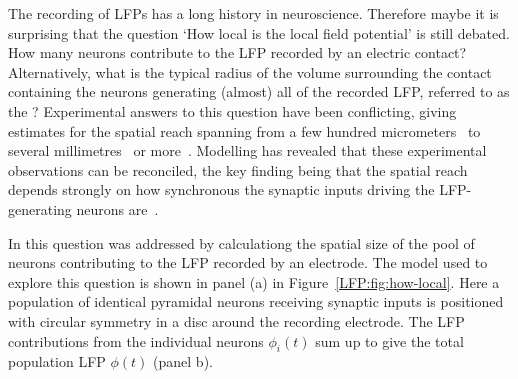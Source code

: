 The recording of LFPs has a long history in neuroscience. Therefore maybe it is surprising that the question 
`How local is the local field potential' is still debated. How many neurons contribute to the LFP 
recorded by an electric contact? Alternatively, what is the typical radius of the volume surrounding the contact containing
the neurons generating (almost) all of the recorded LFP,  referred to as the ? 
Experimental answers to this question have been conflicting, giving estimates for the spatial reach spanning from
a few hundred micrometers~\cite{Katzner2009,Xing2009} to several millimetres~\cite{Kreiman2006} or more~\cite{Kajikawa2011}.
Modelling has revealed that these experimental observations can be reconciled, the key finding being that the spatial reach depends strongly
on how synchronous the synaptic inputs driving the LFP-generating neurons are~\cite{Linden2011}.


In  this question was addressed by calculationg the spatial size of the pool of neurons 
contributing to the LFP recorded by an electrode. The model used to explore this question
is shown in panel (a) in Figure~\ref{LFP:fig:how-local}.
Here a population of identical pyramidal neurons receiving synaptic inputs is positioned
with circular symmetry in a disc around the recording electrode. The LFP contributions from the individual neurons 
$\phi_i(t)$ sum up to give the total population LFP  $\phi(t)$ (panel b).

